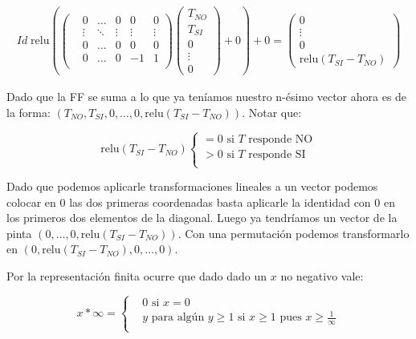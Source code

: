 \begin{align*}
    Id \; \text{relu}\left(\left(\begin{matrix}
        &0      &\dots  &0      &0      &0      \\
        &\vdots &\ddots &\vdots &\vdots &\vdots \\
        &0      &\dots  &0      &0      &0      \\
        &0      &\dots  &0      &-1     &1      \\
    \end{matrix}\right)
        \left(\begin{matrix}
        T_{NO} \\
        T_{SI} \\ 
        0 \\
        \vdots \\
        0
    \end{matrix}\right)+0\right) + 0 = \left(\begin{matrix} 
        0 \\
        \vdots \\
        0 \\
        \text{relu}(T_{SI}-T_{NO})
    \end{matrix}\right)
\end{align*}



Dado que la FF se suma a lo que ya teníamos nuestro n-ésimo vector ahora es de la forma: $(T_{NO}, T_{SI}, 0, \dots, 0, \text{relu}(T_{SI}-T_{NO}))$. Notar que: 

\[\text{relu}(T_{SI}-T_{NO}) \begin{cases}
    = 0 \text{ si $T$ responde NO} \\
    > 0 \text{ si $T$ responde SI} \\
\end{cases}\]


Dado que podemos aplicarle transformaciones lineales a un vector podemos colocar en 0 las dos primeras coordenadas basta aplicarle la identidad con 0 en los primeros dos elementos de la diagonal. Luego ya tendríamos un vector de la pinta $(0, \dots, 0, \text{relu}(T_{SI}-T_{NO}))$. Con una permutación podemos transformarlo en $(0, \text{relu}(T_{SI}-T_{NO}), 0, \dots, 0)$.

Por la representación finita ocurre que dado dado un $x$ no negativo vale:

\[x *\infty = \begin{cases}
    &0 \text{ si } x = 0 \\
    &y \text{ para algún } y \ge 1 \text{ si } x \ge 1 \text{ pues } x \ge \frac{1}{\infty} \\
\end{cases}\]

